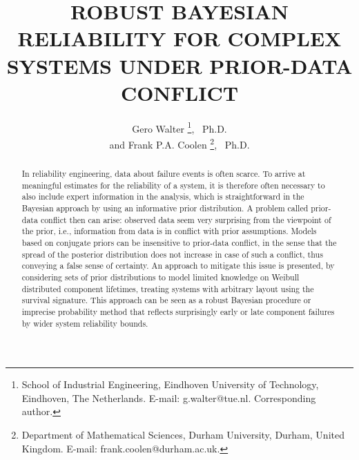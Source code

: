 \documentclass[Journal,SectionNumbers,InsideFigs]{ascelike}
\begin{document}
\title{ROBUST BAYESIAN RELIABILITY FOR COMPLEX SYSTEMS UNDER PRIOR-DATA CONFLICT}

\author{
Gero Walter%
\thanks{
School of Industrial Engineering,
Eindhoven University of Technology, Eindhoven, The Netherlands.
E-mail: g.walter@tue.nl. Corresponding author.},
\ Ph.D.
\\
and
Frank P.A. Coolen%
\thanks{
Department of Mathematical Sciences,
Durham University, Durham, United Kingdom.
E-mail: frank.coolen@durham.ac.uk.},
\ Ph.D.
}

\maketitle

%
%
\begin{abstract}
In reliability engineering, data about failure events is often scarce.
To arrive at meaningful estimates for the reliability of a system,
it is therefore often necessary to also include expert information in the analysis,
which is straightforward in the Bayesian approach by using an informative prior distribution.
%
A problem called prior-data conflict then can arise:
observed data seem very surprising from the viewpoint of the prior,
i.e., information from data is in conflict with prior assumptions.
Models based on conjugate priors can be insensitive to prior-data conflict,
in the sense that the spread of the posterior distribution does not increase in case of such a conflict,
thus conveying a false sense of certainty.
%
An approach to mitigate this issue is presented, by considering sets of prior distributions
to model limited knowledge on Weibull distributed component lifetimes,
treating systems with arbitrary layout using the survival signature.
This approach can be seen as a robust Bayesian procedure or imprecise probability method
that reflects surprisingly early or late component failures
by wider system reliability bounds.
%
\end{abstract}
\end{document}
